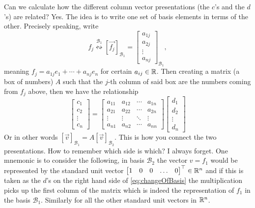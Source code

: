 \documentclass[12pt]{amsart}
\begin{document}
Can we calculate how the different column vector presentations (the $c$'s and the $d$'s) are related? Yes. The idea is to write one set of basis elements in terms of the other. Precisely speaking, write 
\[
	f_j \stackrel{\mathcal{B}_1}{\leftrightsquigarrow} [\vec{f_j}]_{\mathcal{B}_1} = \begin{bmatrix} a_{1j} \\ a_{2j} \\ \vdots\\ a_{nj} \end{bmatrix}_{\mathcal{B}_1},
\] 
meaning $f_j = a_{1j} e_1 + \cdots + a_{nj} e_n$ for certain $a_{ij} \in \mathbb{R}$. Then creating a matrix (a box of numbers) $A$ such that the $j$-th column of said box are the numbers coming from $f_j$ above, then we have the relationship
\begin{equation}\label{eq:changeOfBasis}
	\begin{bmatrix} c_1\\ c_2\\ \vdots \\ c_n \end{bmatrix} = \begin{bmatrix} a_{11} & a_{12} & \cdots & a_{1n} \\ 
a_{21} & a_{22} & \cdots & a_{2n}\\
\vdots & \vdots & \ddots & \vdots \\
a_{n1} & a_{n2} & \cdots  & a_{nn} \end{bmatrix} 
\begin{bmatrix} d_1 \\ d_2\\ \vdots \\d_n \end{bmatrix} 
\end{equation}
Or in other words $[\vec{v}]_{\mathcal{B}_1} = A [\vec{v}]_{\mathcal{B}_2}$.  This is how you connect the two presentations. How to remember which side is which? I always forget. One mnemonic is to consider the following, in basis $\mathcal{B}_2$ the vector $v=f_1$ would be represented by the standard unit vector $\begin{bmatrix} 1 & 0 & 0 & \ldots & 0 \end{bmatrix}^\top \in \mathbb{R}^n$ and if this is taken as the $d$'s on the right hand side of \eqref{eq:changeOfBasis} the multiplication picks up the first column of the matrix which is indeed the representation of $f_1$ in the basis $\mathcal{B}_1$. Similarly for all the other standard unit vectors in $\mathbb{R}^n$. 
\end{document}
